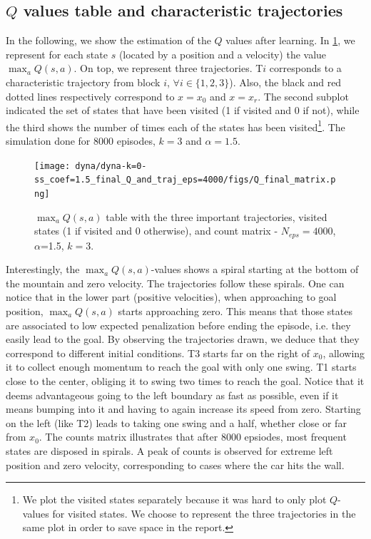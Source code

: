 \documentclass[a4paper, 12pt,oneside]{article}
\begin{document}
        \subsection{$Q$ values table and characteristic trajectories}\label{sec:characteristic-trajectories}
        In the following, we show the estimation of the $Q$ values after learning. In \ref{Qmatrixcounts}, we represent for each state $s$ (located by a position and a velocity) the value $\max_a Q(s,a)$. On top, we represent three trajectories. T$i$ corresponds to a characteristic trajectory from block $i$, $\forall i \in \{1,2,3\}$). Also, the black and red dotted lines respectively correspond to $x=x_0$ and $x=x_r$. 
        The second subplot indicated the set of states that have been visited (1 if visited and 0 if not), while the third shows the number of times each of the states has been visited\footnote{We plot the visited states separately because it was hard to only plot $Q$-values for visited states. We choose to represent the three trajectories in the same plot in order to save space in the report.}. The simulation done for 8000 episodes, $k=3$ and $\alpha=1.5$.
        
        \begin{figure}[h]
            \centering
            \texttt{[image: dyna/dyna-k=0-ss\_coef=1.5\_final\_Q\_and\_traj\_eps=4000/figs/Q\_final\_matrix.png]}
            \caption{$\max_a Q(s,a)$ table with the three important trajectories, visited states (1 if visited and 0 otherwise), and count matrix - $N_{eps}=4000$, $\alpha$=1.5, $k=3$.}
            \label{Qmatrixcounts}
        \end{figure}

        Interestingly, the $\max_a Q(s,a)$-values shows a spiral starting at the bottom of the mountain and zero velocity. The trajectories follow these spirals. 
        One can notice that in the lower part (positive velocities), when approaching to goal position, $\max_a Q(s,a)$ starts approaching zero. This means that those states are associated to low expected penalization before ending the episode, i.e. they easily lead to the goal.  
        By observing the trajectories drawn, we deduce that they correspond to different initial conditions. T3 starts far on the right of $x_0$, allowing it to collect enough momentum to reach the goal with only one swing. T1 starts close to the center, obliging it to swing two times to reach the goal. Notice that it deems advantageous going to the left boundary as fast as possible, even if it means bumping into it and having to again increase its speed from zero. Starting on the left (like T2) leads to taking one swing and a half, whether close or far from $x_0$. 
        The counts matrix illustrates that after 8000 epsiodes, most frequent states are disposed in spirals. A peak of counts is observed for extreme left position and zero velocity, corresponding to cases where the car hits the wall. 
\end{document}
